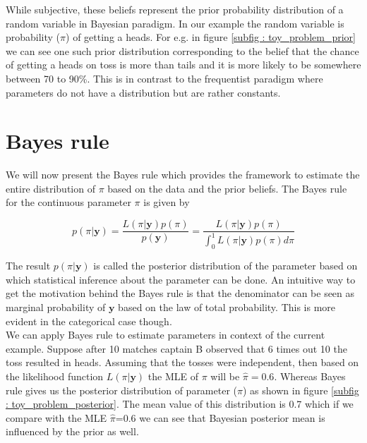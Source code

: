 While subjective, these beliefs represent the prior probability distribution of a random variable in Bayesian paradigm. In our example the random variable is probability ($\pi$) of getting a heads. For e.g. in figure \ref{subfig : toy_problem_prior} we can see one such prior distribution corresponding to the belief that the chance of getting a heads on toss is more than tails and it is more likely to be somewhere between 70 to 90\%. This is in contrast to the frequentist paradigm where parameters do not have a distribution but are rather constants. 

\section{Bayes rule}
\label{sec : bayes_rule}
We will now present the Bayes rule which provides the framework to estimate the entire distribution of $\pi$ based on the data and the prior beliefs. The Bayes rule for the continuous parameter $\pi$ is given by

\begin{equation}
\label{eq : bayes_rule}
p(\pi|\boldsymbol{y}) = \dfrac{L(\pi|\boldsymbol{y})p(\pi)}{p(\boldsymbol{y})} = \dfrac{L(\pi|\boldsymbol{y})p(\pi)}{\int_{0}^{1}L(\pi|\boldsymbol{y})p(\pi)d\pi}
\end{equation}

The result $p(\pi|\boldsymbol{y})$ is called the posterior distribution of the parameter based on which statistical inference about the parameter can be done. An intuitive way to get the motivation behind the Bayes rule is that the denominator can be seen as marginal probability of $\boldsymbol{y}$ based on the law of total probability. This is more evident in the categorical case though.\\

We can apply Bayes rule to estimate parameters in context of the current example. Suppose after 10 matches captain B observed that 6 times out 10 the toss resulted in heads. Assuming that the tosses were independent, then based on the likelihood function $L(\pi|\boldsymbol{y})$ the MLE of $\pi$ will be $\hat{\pi} = 0.6$. Whereas Bayes rule gives us the posterior distribution of parameter ($\pi$) as shown in figure \ref{subfig : toy_problem_posterior}. The mean value of this distribution is 0.7 which if we compare with the MLE $\hat{\pi}$=0.6 we can see that Bayesian posterior mean is influenced by the prior as well.\\

